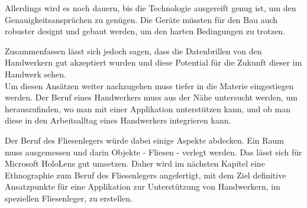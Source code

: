 Allerdings wird es noch dauern, bis die Technologie ausgereift genug ist, um den Genauigkeitsansprüchen zu genügen. Die Geräte müssten für den Bau auch robuster designt und gebaut werden, um den harten Bedingungen zu trotzen. 

Zusammenfassen lässt sich jedoch sagen, dass die Datenbrillen von den Handwerkern gut akzeptiert wurden und diese Potential für die Zukunft dieser im Handwerk sehen. \\
Um diesen Ansätzen weiter nachzugehen muss tiefer in die Materie eingestiegen werden. Der Beruf eines Handwerkers muss aus der Nähe untersucht werden, um herauszufinden, wo man mit einer Applikation unterstützen kann, und ob man diese in den Arbeitsalltag eines Handwerkers integrieren kann. 

Der Beruf des Fliesenlegers würde dabei einige Aspekte abdecken. Ein Raum muss ausgemessen und darin Objekte - Fliesen - verlegt werden. Das lässt sich für Microsoft HoloLens gut umsetzen. Daher wird im nächsten Kapitel eine Ethnographie zum Beruf des Fliesenlegers angefertigt, mit dem Ziel definitive Ansatzpunkte für eine Applikation zur Unterstützung von Handwerkern, im speziellen Fliesenleger, zu erstellen.